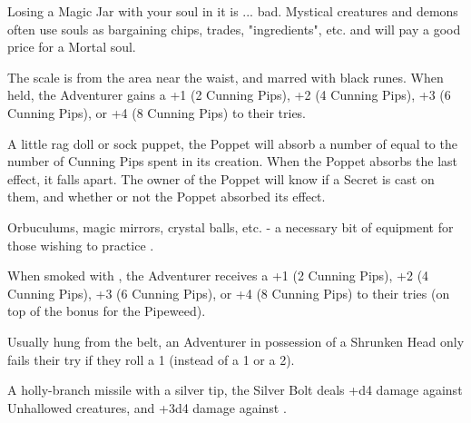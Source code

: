 Losing a Magic Jar with your soul in it is ... bad. Mystical creatures and demons often use souls as bargaining chips, trades, "ingredients", etc. and will pay a good price for a Mortal soul. 



\MARVELS[
  Name=Mermaid's Scale,
  Link=marvels-mermaids-scale,
  Pips=2+
]

The scale is from the area near the waist, and marred with black runes. When held, the Adventurer gains a +1 (2 Cunning Pips), +2 (4 Cunning Pips), +3 (6 Cunning Pips), or +4 (8 Cunning Pips) to their  tries.

\newpage

\MARVELS[
  Name=Poppet,
  Link=marvels-poppet,
  Pips=1+
]

A little rag doll or sock puppet, the Poppet will absorb a number of  equal to the number of Cunning Pips spent in its creation. When the Poppet absorbs the last effect, it falls apart. The owner of the Poppet will know if a Secret is cast on them, and whether or not the Poppet absorbed its effect.

\MARVELS[
  Name=Scrying Vessel,
  Link=marvels-scrying-vessel,
  Pips=4
]

Orbuculums, magic mirrors, crystal balls, etc. - a necessary bit of equipment for those wishing to practice .

\MARVELS[
  Name=Seer's Pipe,
  Link=marvels-seers-pipe,
  Pips=2+
]

When smoked with , the Adventurer receives a +1 (2 Cunning Pips), +2 (4 Cunning Pips), +3 (6 Cunning Pips), or +4 (8 Cunning Pips) to their  tries (on top of the bonus for the Pipeweed).

\MARVELS[
  Name=Shrunken Head,
  Link=marvels-shrunken-head,
  Pips=8
]

Usually hung from the belt, an Adventurer in possession of a Shrunken Head only fails their \INSANITY try if they roll a 1 (instead of a 1 or a 2).



\MARVELS[
  Name=Silver Bolt,
  Link=marvels-silver-bolt,
  Pips=2
]

A holly-branch missile with a silver tip, the Silver Bolt deals +d4 damage against Unhallowed creatures, and +3d4 damage against . 

\cbreak

